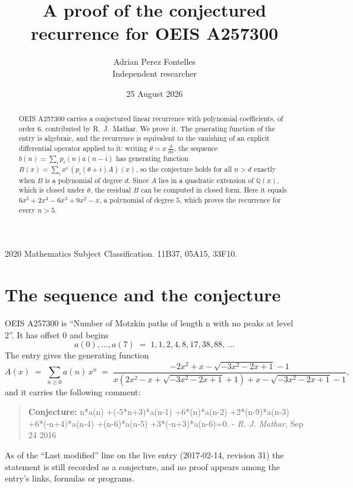 \documentclass[11pt,a4paper]{article}
\title{A proof of the conjectured recurrence for OEIS A257300}
\author{Adrian Perez Fontelles\\ \small Independent researcher}
\date{25 August 2026}
\theoremstyle{plain}
\theoremstyle{definition}
\begin{document}
\maketitle

\begin{abstract}
OEIS A257300 carries a conjectured linear recurrence with polynomial coefficients, of
order 6, contributed by R.~J.~Mathar. We prove it. The generating function of the
entry is algebraic, and the recurrence is equivalent to the vanishing of an explicit
differential operator applied to it: writing $\theta=x\,\frac{d}{dx}$, the sequence
$b(n)=\sum_{i}p_{i}(n)a(n-i)$ has generating function
$B(x)=\sum_{i}x^{i}\,(p_{i}(\theta+i)A)(x)$, so the conjecture holds for all $n>d$ exactly
when $B$ is a polynomial of degree $d$. Since $A$ lies in a quadratic extension of
$\mathbb{Q}(x)$, which is closed under $\theta$, the residual $B$ can be computed in
closed form. Here it equals $6 x^{5} + 2 x^{4} - 6 x^{3} + 9 x^{2} - x$, a polynomial of degree $5$, which proves
the recurrence for every $n>5$.
\end{abstract}

\noindent\small 2020 Mathematics Subject Classification. 11B37, 05A15, 33F10.\normalsize

\section{The sequence and the conjecture}

OEIS A257300 is ``Number of Motzkin paths of length n with no peaks at level 2''. It has offset $0$ and begins
\[
a(0),\dots,a(7)\;=\;1, 1, 2, 4, 8, 17, 38, 88,\ \dots
\]
The entry gives the generating function
\begin{equation}\label{eq:gf}
A(x)\;=\;\sum_{n\ge 0} a(n)\,x^{n}\;=\;\frac{- 2 x^{2} + x - \sqrt{- 3 x^{2} - 2 x + 1} - 1}{x \left(2 x^{2} - x + \sqrt{- 3 x^{2} - 2 x + 1} + 1\right) + x - \sqrt{- 3 x^{2} - 2 x + 1} - 1} ,
\end{equation}
and it carries the following comment:
\begin{quote}\small
\textbf{Conjecture:} n*a(n) +(-5*n+3)*a(n-1) +6*(n)*a(n-2) +2*(n-9)*a(n-3) +6*(-n+4)*a(n-4) +(n-6)*a(n-5) +3*(-n+3)*a(n-6)=0. - \emph{R. J. Mathar}, Sep 24 2016
\end{quote}
As of the ``Last modified'' line on the live entry (2017-02-14, revision 31) the
statement is still recorded as a conjecture, and no proof appears among the entry's links,
formulas or programs.
\end{document}
